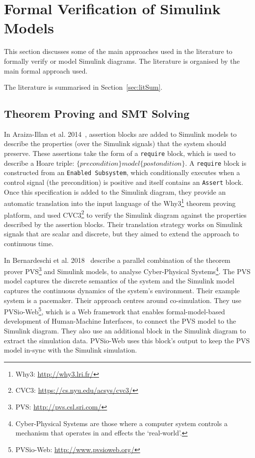 \section{Formal Verification of Simulink Models}
\label{sec:formalSimulinkVerification}

This section discusses some of the main approaches used in the literature to formally verify or model Simulink diagrams. The literature is organised by the main formal approach used.

The literature is summarised in Section~\ref{sec:litSum}.

\subsection{Theorem Proving and SMT Solving}
\label{sec:tp}

In Araiza-Illan et al. 2014~\cite{araiza-illan_formal_2014}, assertion blocks are added to Simulink models to describe the properties (over the Simulink signals) that the system should preserve. These assertions take the form of a \texttt{require} block, which is used to describe a Hoare triple: $\{precondition\} model \{postondition\}$. A \texttt{require} block is constructed from an \texttt{Enabled Subsystem}, which conditionally executes when a control signal (the precondition) is positive and itself contains an \texttt{Assert} block. Once this specification is added to the Simulink diagram, they provide an automatic translation into the input language of the Why3\footnote{Why3: \url{http://why3.lri.fr/}} theorem proving platform, and used CVC3\footnote{CVC3: \url{https://cs.nyu.edu/acsys/cvc3/}} to verify the Simulink diagram against the properties described by the assertion blocks. Their translation strategy works on Simulink signals that are scalar and discrete, but they aimed to extend the approach to continuous time. 

In Bernardeschi et al. 2018~\cite{bernardeschi_pvs-simulink_2018} describe a parallel combination of the theorem prover PVS\footnote{PVS: \url{http://pvs.csl.sri.com/} } and Simulink models, to analyse Cyber-Physical Systems\footnote{Cyber-Physical Systems are those where a computer system controls a mechanism that operates in and effects the `real-world'.}. The PVS model captures the discrete semantics of the system and the Simulink model captures the continuous dynamics of the system's environment. Their example system is a pacemaker. Their approach centres around co-simulation. They use PVSio-Web\footnote{PVSio-Web: \url{http://www.pvsioweb.org/}}, which is a Web framework that enables formal-model-based development of Human-Machine Interfaces, to connect the PVS model to the Simulink diagram. They also use an additional block in the Simulink diagram to extract the simulation data. PVSio-Web uses this block's output to keep the PVS model in-sync with the Simulink simulation.

